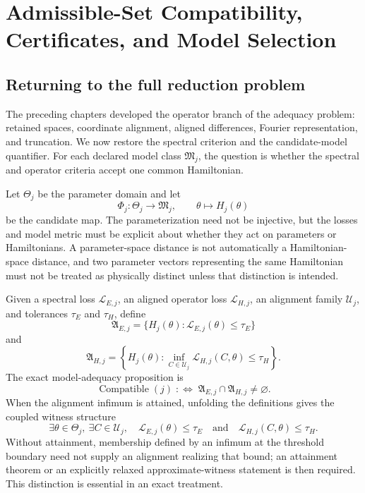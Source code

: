 \chapter{Admissible-Set Compatibility, Certificates, and Model Selection}
\label{ch:reduction-decision}

\section{Returning to the full reduction problem}

The preceding chapters developed the operator branch of the adequacy problem: retained
spaces, coordinate alignment, aligned differences, Fourier representation, and
truncation.  We now restore the spectral criterion and the candidate-model quantifier.
For each declared model class $\mathfrak M_j$, the question is whether the spectral and
operator criteria accept one common Hamiltonian.

Let $\Theta_j$ be the parameter domain and let
\[
  \Phi_j:\Theta_j\longrightarrow\mathfrak M_j,
  \qquad \theta\longmapsto H_j(\theta)
\]
be the candidate map.  The parameterization need not be injective, but the losses and
model metric must be explicit about whether they act on parameters or Hamiltonians.  A
parameter-space distance is not automatically a Hamiltonian-space distance, and two
parameter vectors representing the same Hamiltonian must not be treated as physically
distinct unless that distinction is intended.

Given a spectral loss $\mathcal L_{E,j}$, an aligned operator loss
$\mathcal L_{H,j}$, an alignment family $\mathcal U_j$, and tolerances $\tau_E$ and
$\tau_H$, define
\[
  \mathfrak A_{E,j}
  =\{H_j(\theta):\mathcal L_{E,j}(\theta)\leq\tau_E\}
\]
and
\[
  \mathfrak A_{H,j}
  =\left\{H_j(\theta):
      \inf_{C\in\mathcal U_j}\mathcal L_{H,j}(C,\theta)
      \leq\tau_H
    \right\}.
\]
The exact model-adequacy proposition is
\[
  \operatorname{Compatible}(j)
  \;:\!\Longleftrightarrow\;
  \mathfrak A_{E,j}\cap\mathfrak A_{H,j}\neq\varnothing.
\]
When the alignment infimum is attained, unfolding the definitions gives the coupled
witness structure
\[
  \exists\theta\in\Theta_j,\ \exists C\in\mathcal U_j,
  \quad
  \mathcal L_{E,j}(\theta)\leq\tau_E
  \quad\text{and}\quad
  \mathcal L_{H,j}(C,\theta)\leq\tau_H.
\]
Without attainment, membership defined by an infimum at the threshold boundary need not
supply an alignment realizing that bound; an attainment theorem or an explicitly
relaxed approximate-witness statement is then required.  This distinction is essential
in an exact treatment.

